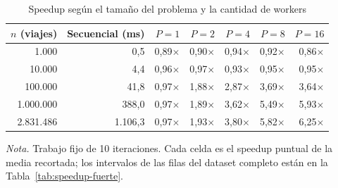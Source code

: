 \begin{table}[H]
\caption{Speedup según el tamaño del problema y la cantidad de workers}\label{tab:speedup-tamano}
\small
\begin{tabular}{@{}rrrrrrr@{}}
\toprule
\textbf{$n$ (viajes)} & \textbf{Secuencial (ms)} & \textbf{$P=1$} & \textbf{$P=2$} & \textbf{$P=4$} & \textbf{$P=8$} & \textbf{$P=16$} \\
\midrule
1.000 & 0,5 & 0,89$\times$ & 0,90$\times$ & 0,94$\times$ & 0,92$\times$ & 0,86$\times$ \\
10.000 & 4,4 & 0,96$\times$ & 0,97$\times$ & 0,93$\times$ & 0,95$\times$ & 0,95$\times$ \\
100.000 & 41,8 & 0,97$\times$ & 1,88$\times$ & 2,87$\times$ & 3,69$\times$ & 3,64$\times$ \\
1.000.000 & 388,0 & 0,97$\times$ & 1,89$\times$ & 3,62$\times$ & 5,49$\times$ & 5,93$\times$ \\
2.831.486 & 1.106,3 & 0,97$\times$ & 1,93$\times$ & 3,80$\times$ & 5,82$\times$ & 6,25$\times$ \\
\bottomrule
\end{tabular}

{\footnotesize\textit{Nota.} Trabajo fijo de 10 iteraciones. Cada celda es el speedup puntual de la media recortada; los intervalos de las filas del dataset completo están en la Tabla~\ref{tab:speedup-fuerte}.\par}
\end{table}
